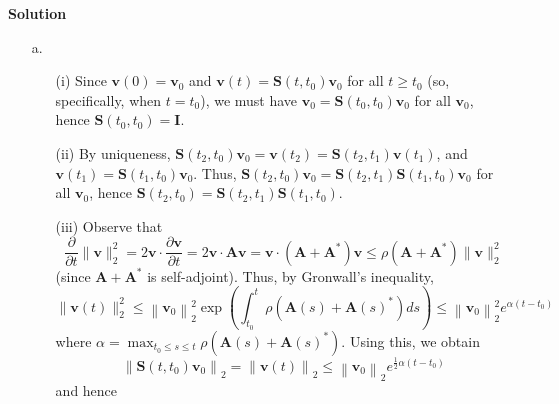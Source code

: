 \documentclass{article}
\begin{document}
\begin{itemize}
{\bf Solution}

\begin{itemize}
\item[a.]
\begin{itemize}
\item[(i)] Since $\mathbf{v}(0) = \mathbf{v}_0$ and $\mathbf{v}(t) = \mathbf{S} \left( t, t_0 \right) \mathbf{v}_0$ for all $t \geq t_0$ (so, specifically, when $t = t_0$), we must have $\mathbf{v}_0 = \mathbf{S} \left( t_0, t_0 \right) \mathbf{v}_0$ for all $\mathbf{v}_0$, hence $\mathbf{S} \left( t_0, t_0 \right) = \mathbf{I}$.
\item[(ii)] By uniqueness, $\mathbf{S} \left( t_2, t_0 \right) \mathbf{v}_0 = \mathbf{v} \left( t_2 \right) = \mathbf{S} \left( t_2, t_1 \right) \mathbf{v} \left( t_1 \right)$, and $\mathbf{v} \left( t_1 \right) = \mathbf{S} \left( t_1, t_0 \right) \mathbf{v}_0$. Thus, $\mathbf{S} \left( t_2, t_0 \right) \mathbf{v}_0 = \mathbf{S} \left( t_2, t_1 \right) \mathbf{S} \left( t_1, t_0 \right) \mathbf{v}_0$ for all $\mathbf{v}_0$, hence $\mathbf{S} \left( t_2, t_0 \right) = \mathbf{S}\left( t_2, t_1 \right) \mathbf{S} \left( t_1, t_0 \right)$.
\item[(iii)] Observe that
\begin{equation*}
\frac{\partial}{\partial t} \lVert \mathbf{v} \rVert_2^2 = 2 \mathbf{v} \cdot \frac{\partial \mathbf{v}}{\partial t} = 2 \mathbf{v} \cdot \mathbf{A} \mathbf{v} = \mathbf{v} \cdot \left( \mathbf{A} + \mathbf{A}^* \right) \mathbf{v} \leq \rho \left( \mathbf{A} + \mathbf{A}^* \right) \lVert \mathbf{v} \rVert_2^2
\end{equation*}
(since $\mathbf{A} + \mathbf{A}^*$ is self-adjoint). Thus, by Gronwall's inequality,
\begin{equation*}
\lVert \mathbf{v}(t) \rVert_2^2 \leq \left\lVert \mathbf{v}_0 \right\rVert_2^2 \exp \left( \int_{t_0}^t \rho \left( \mathbf{A}(s) + \mathbf{A}(s)^* \right) ds \right) \leq \left\lVert \mathbf{v}_0 \right\rVert_2^2 e^{\alpha \left( t - t_0 \right)}
\end{equation*}
where $\alpha = \max_{t_0 \leq s \leq t} \rho \left( \mathbf{A}(s) + \mathbf{A}(s)^* \right)$. Using this, we obtain
\begin{equation*}
\left\lVert \mathbf{S} \left( t, t_0 \right) \mathbf{v}_0 \right\rVert_2 = \left\lVert \mathbf{v}(t) \right\rVert_2 \leq \left\lVert \mathbf{v}_0 \right\rVert_2 e^{\frac{1}{2} \alpha \left( t - t_0 \right)}
\end{equation*}
and hence
\begin{equation*}

\end{equation*}
\end{itemize}
\end{itemize}
\end{itemize}
\end{document}
